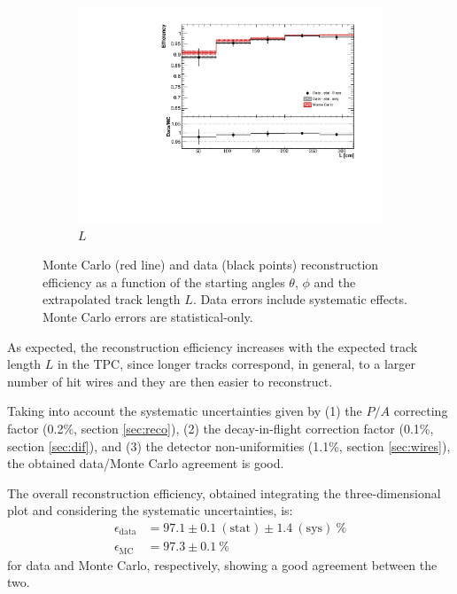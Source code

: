 \documentclass[a4paper,11pt]{article}
\begin{document}
\begin{figure}[htbp]
\begin{center}
\begin{subfigure}{0.5\textwidth}
      \includegraphics[width=\linewidth]{figures/l.pdf}
      \caption{$L$} \label{fig:l}
    \end{subfigure}
    \caption{Monte Carlo (red line) and data (black points) reconstruction efficiency as a function of the starting angles $\theta$, $\phi$ and the extrapolated track length $L$. Data errors include systematic effects. Monte Carlo errors are statistical-only.}\label{fig:1d}
  \end{center}
\end{figure}

As expected, the reconstruction efficiency increases with the expected track length $L$ in the TPC, since longer tracks correspond, in general, to a larger number of hit wires and they are then easier to reconstruct.

Taking into account the systematic uncertainties given by (1) the $P/A$ correcting factor (0.2\%, section \ref{sec:reco}), (2) the decay-in-flight correction factor (0.1\%, section \ref{sec:dif}), and (3) the detector non-uniformities (1.1\%, section \ref{sec:wires}), the obtained data/Monte Carlo agreement is good.%

The overall reconstruction efficiency, obtained integrating the three-dimensional plot and considering the systematic uncertainties, is:
\begin{align*}
\epsilon_{\mathrm{data}} &= 97.1 \pm 0.1~\mathrm{(stat)} \pm 1.4~\mathrm{(sys)}~\%\\
\epsilon_{\mathrm{MC}} &= 97.3 \pm 0.1~\%
\end{align*} for data and Monte Carlo, respectively, showing a good agreement between the two.
\end{document}
